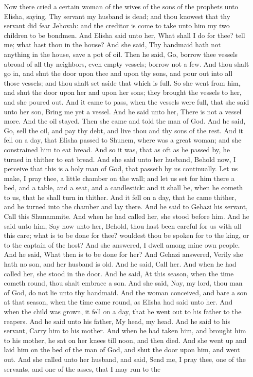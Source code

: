 Now there cried a certain woman of the wives of the sons of the prophets unto Elisha, saying, Thy servant my husband is dead; and thou knowest that thy servant did fear Jehovah: and the creditor is come to take unto him my two children to be bondmen. And Elisha said unto her, What shall I do for thee? tell me; what hast thou in the house? And she said, Thy handmaid hath not anything in the house, save a pot of oil. Then he said, Go, borrow thee vessels abroad of all thy neighbors, even empty vessels; borrow not a few. And thou shalt go in, and shut the door upon thee and upon thy sons, and pour out into all those vessels; and thou shalt set aside that which is full. So she went from him, and shut the door upon her and upon her sons; they brought the vessels to her, and she poured out. And it came to pass, when the vessels were full, that she said unto her son, Bring me yet a vessel. And he said unto her, There is not a vessel more. And the oil stayed. Then she came and told the man of God. And he said, Go, sell the oil, and pay thy debt, and live thou and thy sons of the rest.  And it fell on a day, that Elisha passed to Shunem, where was a great woman; and she constrained him to eat bread. And so it was, that as oft as he passed by, he turned in thither to eat bread. And she said unto her husband, Behold now, I perceive that this is a holy man of God, that passeth by us continually. Let us make, I pray thee, a little chamber on the wall; and let us set for him there a bed, and a table, and a seat, and a candlestick: and it shall be, when he cometh to us, that he shall turn in thither. And it fell on a day, that he came thither, and he turned into the chamber and lay there. And he said to Gehazi his servant, Call this Shunammite. And when he had called her, she stood before him. And he said unto him, Say now unto her, Behold, thou hast been careful for us with all this care; what is to be done for thee? wouldest thou be spoken for to the king, or to the captain of the host? And she answered, I dwell among mine own people. And he said, What then is to be done for her? And Gehazi answered, Verily she hath no son, and her husband is old. And he said, Call her. And when he had called her, she stood in the door. And he said, At this season, when the time cometh round, thou shalt embrace a son. And she said, Nay, my lord, thou man of God, do not lie unto thy handmaid.  And the woman conceived, and bare a son at that season, when the time came round, as Elisha had said unto her. And when the child was grown, it fell on a day, that he went out to his father to the reapers. And he said unto his father, My head, my head. And he said to his servant, Carry him to his mother. And when he had taken him, and brought him to his mother, he sat on her knees till noon, and then died. And she went up and laid him on the bed of the man of God, and shut the door upon him, and went out. And she called unto her husband, and said, Send me, I pray thee, one of the servants, and one of the asses, that I may run to the 